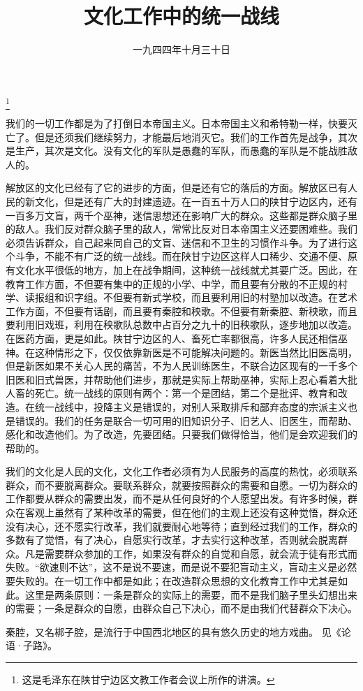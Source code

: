 
\title{文化工作中的统一战线}
\date{一九四四年十月三十日}
\thanks{这是毛泽东在陕甘宁边区文教工作者会议上所作的讲演。}
\maketitle


我们的一切工作都是为了打倒日本帝国主义。日本帝国主义和希特勒一样，快要灭亡了。但是还须我们继续努力，才能最后地消灭它。我们的工作首先是战争，其次是生产，其次是文化。没有文化的军队是愚蠢的军队，而愚蠢的军队是不能战胜敌人的。

解放区的文化已经有了它的进步的方面，但是还有它的落后的方面。解放区已有人民的新文化，但是还有广大的封建遗迹。在一百五十万人口的陕甘宁边区内，还有一百多万文盲，两千个巫神，迷信思想还在影响广大的群众。这些都是群众脑子里的敌人。我们反对群众脑子里的敌人，常常比反对日本帝国主义还要困难些。我们必须告诉群众，自己起来同自己的文盲、迷信和不卫生的习惯作斗争。为了进行这个斗争，不能不有广泛的统一战线。而在陕甘宁边区这样人口稀少、交通不便、原有文化水平很低的地方，加上在战争期间，这种统一战线就尤其要广泛。因此，在教育工作方面，不但要有集中的正规的小学、中学，而且要有分散的不正规的村学、读报组和识字组。不但要有新式学校，而且要利用旧的村塾加以改造。在艺术工作方面，不但要有话剧，而且要有秦腔和秧歌。不但要有新秦腔、新秧歌，而且要利用旧戏班，利用在秧歌队总数中占百分之九十的旧秧歌队，逐步地加以改造。在医药方面，更是如此。陕甘宁边区的人、畜死亡率都很高，许多人民还相信巫神。在这种情形之下，仅仅依靠新医是不可能解决问题的。新医当然比旧医高明，但是新医如果不关心人民的痛苦，不为人民训练医生，不联合边区现有的一千多个旧医和旧式兽医，并帮助他们进步，那就是实际上帮助巫神，实际上忍心看着大批人畜的死亡。统一战线的原则有两个：第一个是团结，第二个是批评、教育和改造。在统一战线中，投降主义是错误的，对别人采取排斥和鄙弃态度的宗派主义也是错误的。我们的任务是联合一切可用的旧知识分子、旧艺人、旧医生，而帮助、感化和改造他们。为了改造，先要团结。只要我们做得恰当，他们是会欢迎我们的帮助的。

我们的文化是人民的文化，文化工作者必须有为人民服务的高度的热忱，必须联系群众，而不要脱离群众。要联系群众，就要按照群众的需要和自愿。一切为群众的工作都要从群众的需要出发，而不是从任何良好的个人愿望出发。有许多时候，群众在客观上虽然有了某种改革的需要，但在他们的主观上还没有这种觉悟，群众还没有决心，还不愿实行改革，我们就要耐心地等待；直到经过我们的工作，群众的多数有了觉悟，有了决心，自愿实行改革，才去实行这种改革，否则就会脱离群众。凡是需要群众参加的工作，如果没有群众的自觉和自愿，就会流于徒有形式而失败。“欲速则不达”，这不是说不要速，而是说不要犯盲动主义，盲动主义是必然要失败的。在一切工作中都是如此；在改造群众思想的文化教育工作中尤其是如此。这里是两条原则：一条是群众的实际上的需要，而不是我们脑子里头幻想出来的需要；一条是群众的自愿，由群众自己下决心，而不是由我们代替群众下决心。


\begin{maonote}
秦腔，又名梆子腔，是流行于中国西北地区的具有悠久历史的地方戏曲。
见《论语·子路》。
\end{maonote}

